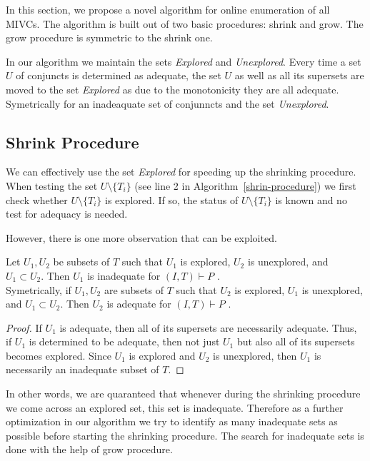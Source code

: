In this section, we propose a novel algorithm for online enumeration of all MIVCs. The algorithm is built out of two basic procedures: shrink and grow. The grow procedure is symmetric to the shrink one.
 
In our algorithm we maintain the sets \textit{Explored} and  \textit{Unexplored}. Every time a set $U$ of conjuncts is determined as adequate, the set $U$ as well as all its supersets are moved to the set  \textit{Explored} as due to the monotonicity they are all adequate. Symetrically for an inadeaquate set of conjunncts and the set \textit{Unexplored}. 

\subsection{Shrink Procedure}
We can effectively use the set  \textit{Explored} for speeding up the shrinking procedure. When testing the set $U \setminus \{T_i\}$ (see line 2 in Algorithm~\ref{shrin-procedure}) we first check whether  $U \setminus \{T_i\}$ is explored. If so, the status of  $U \setminus \{T_i\}$ is known and no test for adequacy is needed.

However, there is one more observation that can be exploited. 


\begin{observation}
\label{observation:explored-property}
Let $U_1, U_2$ be subsets of $T$ such that $U_1$ is explored, $U_2$ is unexplored, and $U_1 \subset U_2$. Then $U_1$ is inadequate  for $(I, T) \vdash P$ .\\
Symetrically, if $U_1, U_2$ are subsets of $T$ such that $U_2$ is explored, $U_1$ is unexplored, and $U_1 \subset U_2$. Then $U_2$ is adequate  for $(I, T) \vdash P$ .
\end{observation} 

\begin{proof}
If $U_1$ is adequate, then all of its supersets are necessarily adequate. Thus, if $U_1$ is determined to be adequate, then not just $U_1$ but also all of its supersets becomes explored. Since $U_1$ is explored and $U_2$ is unexplored, then $U_1$ is necessarily an inadequate subset of $T$.
\end{proof}

In other words, we are quaranteed that whenever during the shrinking procedure we come across an explored set, this set is inadequate. Therefore as a further optimization in our algorithm we try to identify as many inadequate sets as possible before starting the shrinking procedure. The search for inadequate sets is done with the help  of grow procedure. 


